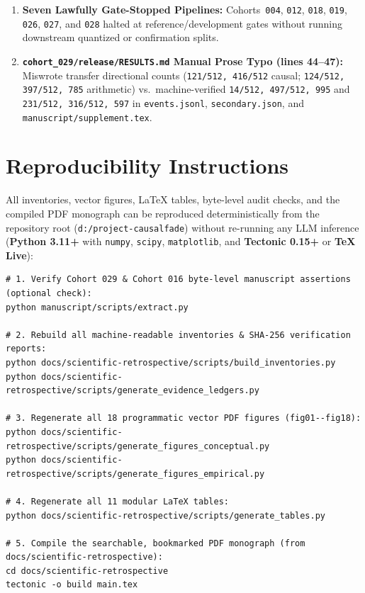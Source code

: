 \begin{enumerate}
  \item \textbf{Seven Lawfully Gate-Stopped Pipelines:} Cohorts~\texttt{004}, \texttt{012}, \texttt{018}, \texttt{019}, \texttt{026}, \texttt{027}, and \texttt{028} halted at reference/development gates without running downstream quantized or confirmation splits.
  \item \textbf{\texttt{cohort\_029/release/RESULTS.md} Manual Prose Typo (lines 44--47):} Miswrote transfer directional counts (\texttt{121/512, 416/512} causal; \texttt{124/512, 397/512, 785} arithmetic) vs.\ machine-verified \texttt{14/512, 497/512, 995} and \texttt{231/512, 316/512, 597} in \texttt{events.jsonl}, \texttt{secondary.json}, and \texttt{manuscript/supplement.tex}.
\end{enumerate}

\chapter{Reproducibility Instructions}\label{app:reproducibility}
All inventories, vector figures, LaTeX tables, byte-level audit checks, and the compiled PDF monograph can be reproduced deterministically from the repository root (\texttt{d:/project-causalfade}) without re-running any LLM inference (\textbf{Python 3.11+} with \texttt{numpy}, \texttt{scipy}, \texttt{matplotlib}, and \textbf{Tectonic 0.15+} or \textbf{TeX Live}):

\begin{lstlisting}
# 1. Verify Cohort 029 & Cohort 016 byte-level manuscript assertions (optional check):
python manuscript/scripts/extract.py

# 2. Rebuild all machine-readable inventories & SHA-256 verification reports:
python docs/scientific-retrospective/scripts/build_inventories.py
python docs/scientific-retrospective/scripts/generate_evidence_ledgers.py

# 3. Regenerate all 18 programmatic vector PDF figures (fig01--fig18):
python docs/scientific-retrospective/scripts/generate_figures_conceptual.py
python docs/scientific-retrospective/scripts/generate_figures_empirical.py

# 4. Regenerate all 11 modular LaTeX tables:
python docs/scientific-retrospective/scripts/generate_tables.py

# 5. Compile the searchable, bookmarked PDF monograph (from docs/scientific-retrospective):
cd docs/scientific-retrospective
tectonic -o build main.tex
\end{lstlisting}

